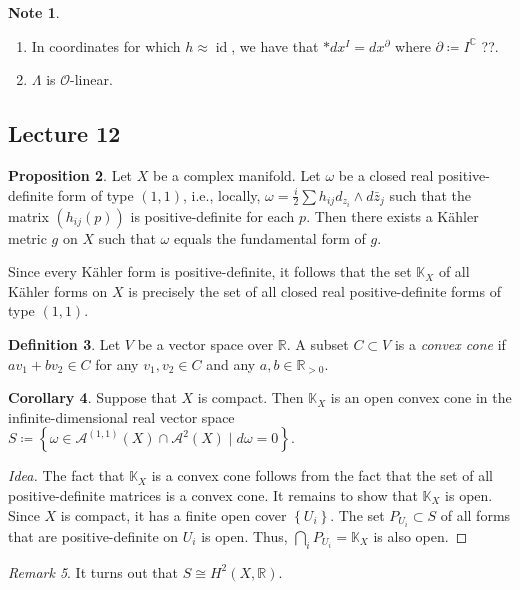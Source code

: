 \documentclass[10pt,letterpaper,cm]{nupset}
\theoremstyle{definition}
\newtheorem{defn}{Definition}[subsection]
\newtheorem{note}[defn]{Note}
\theoremstyle{theorem}
\newtheorem{prop}[defn]{Proposition}
\newtheorem{corollary}[defn]{Corollary}
\theoremstyle{remark}
\newtheorem{remark}[defn]{Remark}
\newcommand{\A}{\mathcal A}
\newcommand{\C}{\mathbb C}
\newcommand{\K}{\mathbb K}
\renewcommand{\O}{\mathcal O}
\newcommand{\R}{\mathbb{R}}
\newcommand{\1}{\mathbb{1}}
\newcommand{\0}{\vec 0}
\DeclareMathOperator{\id}{id}
\newcommand{\be}{\begin{enumerate}}
\newcommand{\ee}{\end{enumerate}}
\begin{document}
\begin{note} $ $
\be
\item In coordinates for which $h\approx \id$, we have that $\ast{d{x^I}} = d{x^{\partial}}$ where $\partial \coloneqq I^{\C}$ ??.
\item $\Lambda$ is $\O$-linear.
\ee
\end{note}

\subsection{Lecture 12}

\begin{prop}
Let $X$ be a complex manifold. Let $\omega$ be a closed real positive-definite form of type $\left(1,1\right)$, i.e., locally, $\omega = \frac{i}{2}\sum h_{ij}d_{z_i}\wedge d{\bar{z}_j}$ such that the matrix $\left(h_{ij}(p)\right)$ is positive-definite for each $p$. Then there exists a K\"ahler metric $g$ on $X$ such that $\omega$ equals the fundamental form of $g$. 
\end{prop}

Since every K\"ahler form is positive-definite, it follows that the set $\K_X$ of all K\"ahler forms on $X$ is precisely the set of all closed real positive-definite forms of type $\left(1,1\right)$.

\begin{defn}
Let $V$ be a vector space over $\R$. A subset $C\subset V$ is a \textit{convex cone} if $av_1 + bv_2 \in C$ for any $v_1, v_2\in C$ and any $a,b\in \R_{>0}$.
\end{defn}

\begin{corollary}
Suppose that $X$ is compact. Then $\K_X$ is an open convex cone in the infinite-dimensional real vector space $S\coloneqq \left\{\omega \in \A^{(1,1)}\left(X\right) \cap \A^2\left(X\right) \mid d{\omega} =0\right\}$.
\end{corollary}
\begin{proof}[Idea]
The fact that $\K_X$ is a convex cone follows from the fact that the set of all positive-definite matrices is a convex cone. It remains to show that $\K_X$ is open. Since $X$ is compact, it has a finite open cover $\left\{U_i\right\}$. The set $P_{U_i}\subset S$ of all  forms that are positive-definite on $U_i$ is open. Thus, $\bigcap_i P_{U_i} = \K_X$  is also open.
\end{proof}

\begin{remark}
It turns out that $S \cong H^2\left(X, \R\right)$.
\end{remark}
\end{document}
